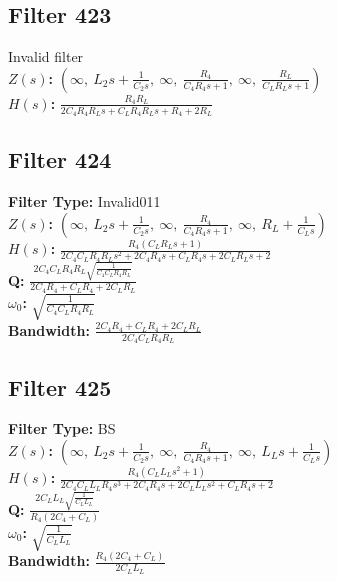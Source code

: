 \documentclass{article}
\begin{document}
\subsection*{Filter 423}
Invalid filter \\ 
\textbf{$Z(s)$:} $\left( \infty, \  L_{2} s + \frac{1}{C_{2} s}, \  \infty, \  \frac{R_{4}}{C_{4} R_{4} s + 1}, \  \infty, \  \frac{R_{L}}{C_{L} R_{L} s + 1}\right)$ \\ 
\textbf{$H(s)$:} $\frac{R_{4} R_{L}}{2 C_{4} R_{4} R_{L} s + C_{L} R_{4} R_{L} s + R_{4} + 2 R_{L}}$ \\ 
\subsection*{Filter 424}
\textbf{Filter Type:} Invalid011 \\ 
\textbf{$Z(s)$:} $\left( \infty, \  L_{2} s + \frac{1}{C_{2} s}, \  \infty, \  \frac{R_{4}}{C_{4} R_{4} s + 1}, \  \infty, \  R_{L} + \frac{1}{C_{L} s}\right)$ \\ 
\textbf{$H(s)$:} $\frac{R_{4} \left(C_{L} R_{L} s + 1\right)}{2 C_{4} C_{L} R_{4} R_{L} s^{2} + 2 C_{4} R_{4} s + C_{L} R_{4} s + 2 C_{L} R_{L} s + 2}$ \\ 
\textbf{Q:} $\frac{2 C_{4} C_{L} R_{4} R_{L} \sqrt{\frac{1}{C_{4} C_{L} R_{4} R_{L}}}}{2 C_{4} R_{4} + C_{L} R_{4} + 2 C_{L} R_{L}}$ \\ 
\textbf{$\omega_0$:} $\sqrt{\frac{1}{C_{4} C_{L} R_{4} R_{L}}}$ \\ 
\textbf{Bandwidth:} $\frac{2 C_{4} R_{4} + C_{L} R_{4} + 2 C_{L} R_{L}}{2 C_{4} C_{L} R_{4} R_{L}}$ \\ 
\subsection*{Filter 425}
\textbf{Filter Type:} BS \\ 
\textbf{$Z(s)$:} $\left( \infty, \  L_{2} s + \frac{1}{C_{2} s}, \  \infty, \  \frac{R_{4}}{C_{4} R_{4} s + 1}, \  \infty, \  L_{L} s + \frac{1}{C_{L} s}\right)$ \\ 
\textbf{$H(s)$:} $\frac{R_{4} \left(C_{L} L_{L} s^{2} + 1\right)}{2 C_{4} C_{L} L_{L} R_{4} s^{3} + 2 C_{4} R_{4} s + 2 C_{L} L_{L} s^{2} + C_{L} R_{4} s + 2}$ \\ 
\textbf{Q:} $\frac{2 C_{L} L_{L} \sqrt{\frac{1}{C_{L} L_{L}}}}{R_{4} \left(2 C_{4} + C_{L}\right)}$ \\ 
\textbf{$\omega_0$:} $\sqrt{\frac{1}{C_{L} L_{L}}}$ \\ 
\textbf{Bandwidth:} $\frac{R_{4} \left(2 C_{4} + C_{L}\right)}{2 C_{L} L_{L}}$ \\ 
\end{document}
